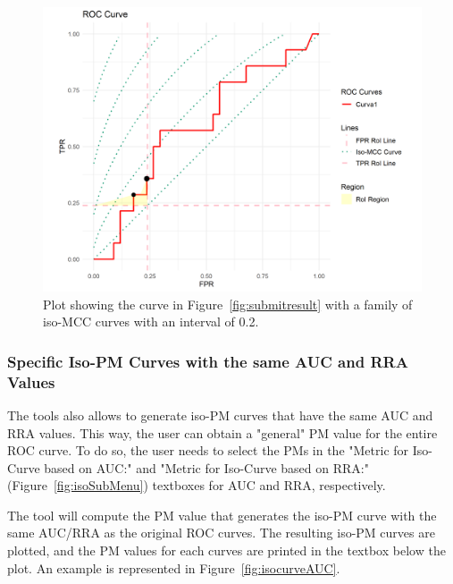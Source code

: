 \documentclass{article}
\begin{document}
	 \begin{figure}[h!]
	 	\centering
	 	\caption{Plot showing the curve in Figure~\ref{fig:submitresult} with a family of iso-MCC curves with an interval of 0.2.}
	 	\label{fig:isoFamPlot}
	 	\includegraphics[width=1\linewidth]{Figures/plot_family_iso.png}
	 \end{figure}
	 
	 \subsubsection{Specific Iso-PM Curves with the same AUC and RRA Values}
	 The tools also allows to generate iso-PM curves that have the same AUC and RRA values. This way, the user can obtain a "general" PM value for the entire ROC curve. To do so, the user needs to select the PMs in the "Metric for Iso-Curve based on AUC:" and "Metric for Iso-Curve based on RRA:" (Figure~\ref{fig:isoSubMenu}) textboxes for AUC and RRA, respectively.
	 
	 The tool will compute the PM value that generates the iso-PM curve with the same AUC/RRA as the original ROC curves. The resulting iso-PM curves are plotted, and the PM values for each curves are printed in the textbox below the plot. An example is represented in Figure~\ref{fig:isocurveAUC}.
	 
\end{document}
